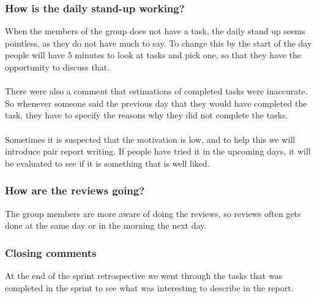 \subsubsection*{How is the daily stand-up working?}
When the members of the group does not have a task, the daily stand up seems pointless, as they do not have much to say.
To change this by the start of the day people will have 5 minutes to look at tasks and pick one, so that they have the opportunity to discuss that.
\\\\
There were also a comment that estimations of completed tasks were inaccurate.
So whenever someone said the previous day that they would have completed the task, they have to specify the reasons why they did not complete the tasks.
\\\\
Sometimes it is suspected that the motivation is low, and to help this we will introduce pair report writing.
If people have tried it in the upcoming days, it will be evaluated to see if it is something that is well liked.

\subsubsection*{How are the reviews going?}
The group members are more aware of doing the reviews, so reviews often gets done at the same day or in the morning the next day.

\subsubsection*{Closing comments}
At the end of the sprint retrospective we went through the tasks that was completed in the sprint to see what was interesting to describe in the report.

